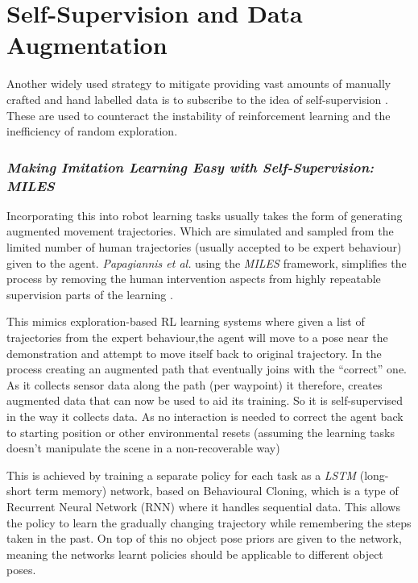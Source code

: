 \section{Self-Supervision and Data Augmentation}
Another widely used strategy to mitigate providing vast amounts of manually crafted and hand labelled data is to subscribe to the idea of self-supervision . These are used to counteract the instability of reinforcement learning and the inefficiency of random exploration.

\subsubsection{\emph{Making Imitation Learning Easy with Self-Supervision: MILES}}
Incorporating this into robot learning tasks usually takes the form of generating augmented movement trajectories. Which are simulated and sampled from the limited number of human trajectories (usually accepted to be expert behaviour) given to the agent. \emph{Papagiannis et al.} using the \emph{MILES} framework, simplifies the process by removing the human intervention aspects from highly repeatable supervision parts of the learning \cite{papagiannis2024milesmakingimitationlearning}. 

This mimics exploration-based RL learning systems where given a list of trajectories from the expert behaviour,the agent will move to a pose near the demonstration and attempt to move itself back to original trajectory. In the process creating an augmented path that eventually joins with the ``correct'' one. As it collects sensor data along the path (per waypoint) it therefore, creates augmented data that can now be used to aid its training. So it is self-supervised in the way it collects data. As no interaction is needed to correct the agent back to starting position or other environmental resets (assuming the learning tasks doesn't manipulate the scene in a non-recoverable way)

This is achieved by training a separate policy for each task as a \emph{LSTM} (long-short term memory) network, based on Behavioural Cloning, which is a type of Recurrent Neural Network (RNN) where it handles sequential data. This allows the policy to learn the gradually changing trajectory while remembering the steps taken in the past. On top of this no object pose priors are given to the network, meaning the networks learnt policies should be applicable to different object poses.

